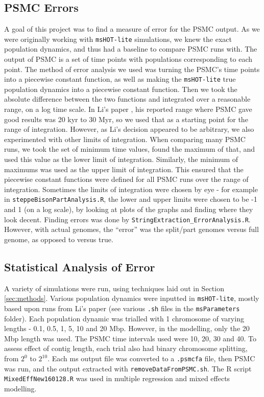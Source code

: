\documentclass[11pt,a4paper]{article}
\begin{document}
\subsection{PSMC Errors}
A goal of this project was to find a measure of error for the PSMC output. As we were originally working with \verb|msHOT-lite| simulations, we knew the exact population dynamics, and thus had a baseline to compare PSMC runs with. The output of PSMC is a set of time points with populations corresponding to each point. The method of error analysis we used was turning the PSMC's time points into a piecewise constant function, as well as making the \verb|msHOT-lite| true population dynamics into a piecewise constant function. Then we took the absolute difference between the two functions and integrated over a reasonable range, on a log time scale. In Li's paper \cite{li2011inference}, his reported range where PSMC gave good results was 20 kyr to 30 Myr, so we used that as a starting point for the range of integration. However, as Li's decision appeared to be arbitrary, we also experimented with other limits of integration. When comparing many PSMC runs, we took the set of minimum time values, found the maximum of that, and used this value as the lower limit of integration. Similarly, the minimum of maximums was used as the upper limit of integration. This ensured that the piecewise constant functions were defined for all PSMC runs over the range of integration. Sometimes the limits of integration were chosen by eye - for example in \verb|steppeBisonPartAnalysis.R|, the lower and upper limits were chosen to be -1 and 1 (on a log scale), by looking at plots of the graphs and finding where they look decent. Finding errors was done by \verb|StringExtraction_ErrorAnalysis.R|. However, with actual genomes, the ``error'' was the split/part genomes versus full genome, as opposed to versus true.

\subsection{Statistical Analysis of Error}
A variety of simulations were run, using techniques laid out in Section \ref{sec:methods}. Various population dynamics were inputted in \verb|msHOT-lite|, mostly based upon runs from Li's paper \cite{li2011inference} (see various \verb|.sh| files in the \verb|msParameters| folder). Each population dynamic was trialled with 1 chromosome of varying lengths - 0.1, 0.5, 1, 5, 10 and 20 Mbp. However, in the modelling, only the 20 Mbp length was used. The PSMC time intervals used were 10, 20, 30 and 40. To assess effect of contig length, each trial also had binary chromosome splitting, from $2^0$ to $2^{10}$. Each ms output file was converted to a \verb|.psmcfa| file, then PSMC was run, and the output extracted with \verb|removeDataFromPSMC.sh|. The R script \verb|MixedEffNew160128.R| was used in multiple regression and mixed effects modelling.
\end{document}
